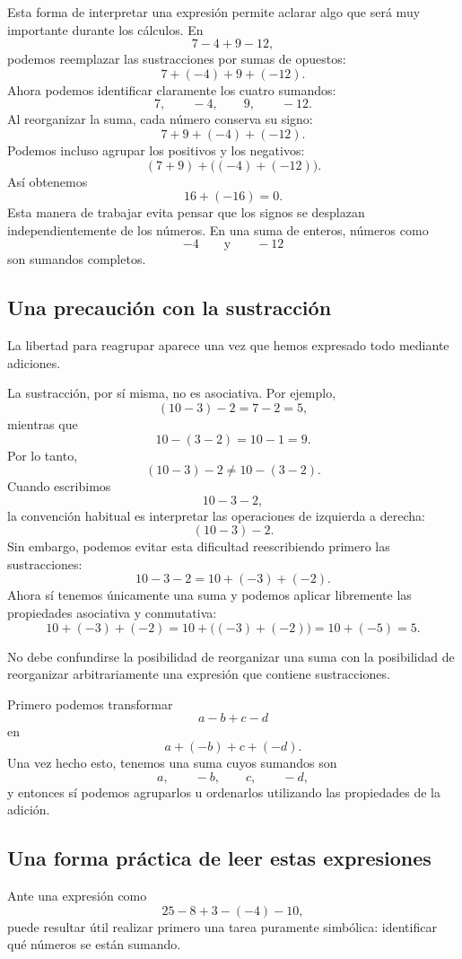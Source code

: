 Esta forma de interpretar una expresión permite aclarar algo que será muy importante durante los cálculos.
En
\[
7-4+9-12,
\]
podemos reemplazar las sustracciones por sumas de opuestos:
\[
7+(-4)+9+(-12).
\]
Ahora podemos identificar claramente los cuatro sumandos:
\[
7,\qquad-4,\qquad9,\qquad-12.
\]
Al reorganizar la suma, cada número conserva su signo:
\[
7+9+(-4)+(-12).
\]
Podemos incluso agrupar los positivos y los negativos:
\[
(7+9)+\bigl((-4)+(-12)\bigr).
\]
Así obtenemos
\[
16+(-16)=0.
\]
Esta manera de trabajar evita pensar que los signos se desplazan independientemente de los números. En una suma de enteros, números como
\[
-4
\qquad\text{y}\qquad
-12
\]
son sumandos completos.

\subsection{Una precaución con la sustracción}

La libertad para reagrupar aparece una vez que hemos expresado todo mediante adiciones.

La sustracción, por sí misma, no es asociativa.
Por ejemplo,
\[
(10-3)-2=7-2=5,
\]
mientras que
\[
10-(3-2)=10-1=9.
\]
Por lo tanto,
\[
(10-3)-2\neq10-(3-2).
\]
Cuando escribimos
\[
10-3-2,
\]
la convención habitual es interpretar las operaciones de izquierda a derecha:
\[
(10-3)-2.
\]
Sin embargo, podemos evitar esta dificultad reescribiendo primero las sustracciones:
\[
10-3-2
=
10+(-3)+(-2).
\]
Ahora sí tenemos únicamente una suma y podemos aplicar libremente las propiedades asociativa y conmutativa:
\[
10+(-3)+(-2)
=
10+\bigl((-3)+(-2)\bigr)
=
10+(-5)
=
5.
\]

\begin{note}
No debe confundirse la posibilidad de reorganizar una suma con la posibilidad de reorganizar arbitrariamente una expresión que contiene sustracciones.

Primero podemos transformar
\[
a-b+c-d
\]
en
\[
a+(-b)+c+(-d).
\]
Una vez hecho esto, tenemos una suma cuyos sumandos son
\[
a,\qquad -b,\qquad c,\qquad -d,
\]
y entonces sí podemos agruparlos u ordenarlos utilizando las propiedades de la adición.
\end{note}

\subsection{Una forma práctica de leer estas expresiones}

Ante una expresión como
\[
25-8+3-(-4)-10,
\]
puede resultar útil realizar primero una tarea puramente simbólica: identificar qué números se están sumando.

